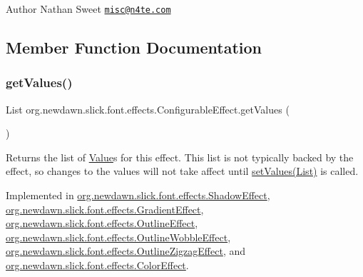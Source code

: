 \begin{DoxyAuthor}{Author}
Nathan Sweet \href{mailto:misc@n4te.com}{\tt misc@n4te.\+com} 
\end{DoxyAuthor}


\subsection{Member Function Documentation}
\mbox{\label{interfaceorg_1_1newdawn_1_1slick_1_1font_1_1effects_1_1_configurable_effect_ac4ea8fedf0f9d7ca7ffe1bd5543d78cb}} 
\subsubsection{\texorpdfstring{get\+Values()}{getValues()}}
{\footnotesize\ttfamily List org.\+newdawn.\+slick.\+font.\+effects.\+Configurable\+Effect.\+get\+Values (\begin{DoxyParamCaption}{ }\end{DoxyParamCaption})}

Returns the list of \mbox{\hyperlink{interfaceorg_1_1newdawn_1_1slick_1_1font_1_1effects_1_1_configurable_effect_1_1_value}{Value}}s for this effect. This list is not typically backed by the effect, so changes to the values will not take affect until \mbox{\hyperlink{interfaceorg_1_1newdawn_1_1slick_1_1font_1_1effects_1_1_configurable_effect_ac5e1cb43cb0c6b61753616dc746903a2}{set\+Values(\+List)}} is called. 

Implemented in \mbox{\hyperlink{classorg_1_1newdawn_1_1slick_1_1font_1_1effects_1_1_shadow_effect_ae193ed21854ee9c0b05080dcd6cc8aa2}{org.\+newdawn.\+slick.\+font.\+effects.\+Shadow\+Effect}}, \mbox{\hyperlink{classorg_1_1newdawn_1_1slick_1_1font_1_1effects_1_1_gradient_effect_a782e65336c5a227dabe24d53e2d8db54}{org.\+newdawn.\+slick.\+font.\+effects.\+Gradient\+Effect}}, \mbox{\hyperlink{classorg_1_1newdawn_1_1slick_1_1font_1_1effects_1_1_outline_effect_adbf0ba0c8ddcdc2a53c6a4e8c583fa33}{org.\+newdawn.\+slick.\+font.\+effects.\+Outline\+Effect}}, \mbox{\hyperlink{classorg_1_1newdawn_1_1slick_1_1font_1_1effects_1_1_outline_wobble_effect_a2276b90cf10a498d50044fb2c451e455}{org.\+newdawn.\+slick.\+font.\+effects.\+Outline\+Wobble\+Effect}}, \mbox{\hyperlink{classorg_1_1newdawn_1_1slick_1_1font_1_1effects_1_1_outline_zigzag_effect_a41397dd750668c7f87bbbe01a441a8d0}{org.\+newdawn.\+slick.\+font.\+effects.\+Outline\+Zigzag\+Effect}}, and \mbox{\hyperlink{classorg_1_1newdawn_1_1slick_1_1font_1_1effects_1_1_color_effect_a295d74daac884b7e5dda1bbbd1263547}{org.\+newdawn.\+slick.\+font.\+effects.\+Color\+Effect}}.

